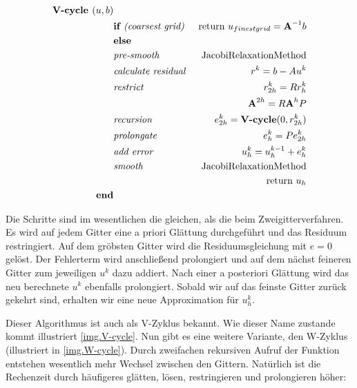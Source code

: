 \begin{eqnarray}
\textbf{V-cycle }(u,b)                         & \notag \\
&\textbf{if }\textit{(coarsest grid) }&\textnormal{return } u_{finest grid}={\textbf{A}}^{-1}b \notag \\
&\textbf{else }                                                & \notag \\
&\textit{pre-smooth }                                 &\textnormal{JacobiRelaxationMethod} \notag \\
&\textit{calculate residual }                &r^{k} = b - Au^{k} \notag \\
&\textit{restrict }                                 &r^{k}_{2h}=Rr^{k}_{h} \notag \\
&                                                                        &{\textbf{A}}^{2h} = R{\textbf{A}}^{h}P \notag \\
&\textit{recursion }                                &e^{k}_{2h} = \textbf{V-cycle}(0,r^{k}_{2h}) \notag \\
&\textit{prolongate }                                &e^{k}_{h} = Pe^{k}_{2h} \notag \\
&\textit{add error }                                &u^{k}_{h} = u^{k-1}_{h} + e^{k}_{h} \notag \\
&\textit{smooth }                                        &\textnormal{JacobiRelaxationMethod} \notag \\
&                                                                        &\textnormal{return } u_{h} \notag \\
\textbf{end}                                                & \notag
\end{eqnarray}

Die Schritte sind im wesentlichen die gleichen, als die beim Zweigitterverfahren. Es wird auf jedem Gitter eine a priori Glättung durchgeführt und das Residuum restringiert. Auf dem gröbsten Gitter wird die Residuumsgleichung mit $e = 0$ gelöst. Der Fehlerterm wird anschließend prolongiert und auf dem nächst feineren Gitter zum jeweiligen $u^{k}$ dazu addiert. Nach einer a posteriori Glättung wird das neu berechnete $u^{k}$ ebenfalls prolongiert. Sobald wir auf das feinste Gitter zurück gekehrt sind, erhalten wir eine neue Approximation für $u_{h}^{k}$.

\label{img.V-cycle}

Dieser Algorithmus ist auch als V-Zyklus bekannt. Wie dieser Name zustande kommt illustriert \autoref{img.V-cycle}. Nun gibt es eine weitere Variante, den W-Zyklus (illustriert in \autoref{img.W-cycle}). Durch zweifachen rekursiven Aufruf der Funktion entstehen wesentlich mehr Wechsel zwischen den Gittern. Natürlich ist die Rechenzeit durch häufigeres glätten, lösen, restringieren und prolongieren höher:

